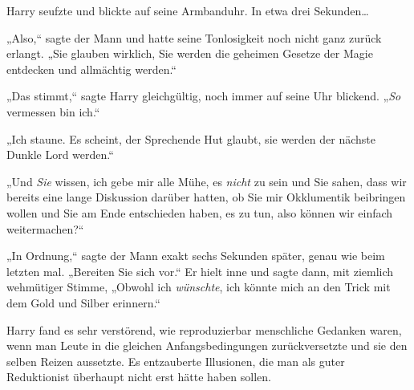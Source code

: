 Harry seufzte und blickte auf seine Armbanduhr. In etwa drei Sekunden…

„Also,“ sagte der Mann und hatte seine Tonlosigkeit noch nicht ganz zurück erlangt. „Sie glauben wirklich, Sie werden die geheimen Gesetze der Magie entdecken und allmächtig werden.“

„Das stimmt,“ sagte Harry gleichgültig, noch immer auf seine Uhr blickend. „\emph{So} vermessen bin ich.“

„Ich staune. Es scheint, der Sprechende Hut glaubt, sie werden der nächste Dunkle Lord werden.“

„Und \emph{Sie} wissen, ich gebe mir alle Mühe, es \emph{nicht} zu sein und Sie sahen, dass wir bereits eine lange Diskussion darüber hatten, ob Sie mir Okklumentik beibringen wollen und Sie am Ende entschieden haben, es zu tun, also können wir einfach weitermachen?“

„In Ordnung,“ sagte der Mann exakt sechs Sekunden später, genau wie beim letzten mal. „Bereiten Sie sich vor.“ Er hielt inne und sagte dann, mit ziemlich wehmütiger Stimme, „Obwohl ich \emph{wünschte}, ich könnte mich an den Trick mit dem Gold und Silber erinnern.“

Harry fand es sehr verstörend, wie reproduzierbar menschliche Gedanken waren, wenn man Leute in die gleichen Anfangsbedingungen zurückversetzte und sie den selben Reizen aussetzte. Es entzauberte Illusionen, die man als guter Reduktionist überhaupt nicht erst hätte haben sollen.

